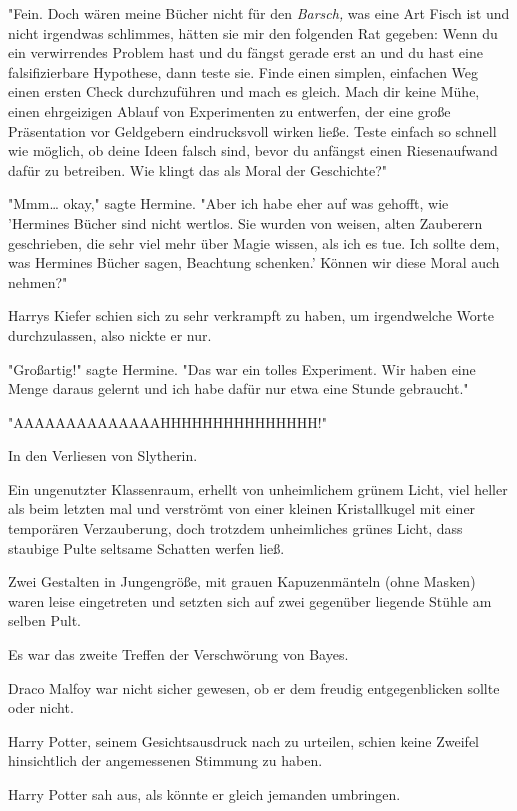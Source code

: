 {"Fein. Doch wären meine Bücher nicht für den \emph{Barsch,} was eine Art Fisch ist und nicht irgendwas schlimmes, hätten sie mir den folgenden Rat gegeben: Wenn du ein verwirrendes Problem hast und du fängst gerade erst an und du hast eine falsifizierbare Hypothese, dann teste sie. Finde einen simplen, einfachen Weg einen ersten Check durchzuführen und mach es gleich. Mach dir keine Mühe, einen ehrgeizigen Ablauf von Experimenten zu entwerfen, der eine große Präsentation vor Geldgebern eindrucksvoll wirken ließe. Teste einfach so schnell wie möglich, ob deine Ideen falsch sind, bevor du anfängst einen Riesenaufwand dafür zu betreiben. Wie klingt das als Moral der Geschichte?"

"Mmm… okay," sagte Hermine. "Aber ich habe eher auf was gehofft, wie 'Hermines Bücher sind nicht wertlos. Sie wurden von weisen, alten Zauberern geschrieben, die sehr viel mehr über Magie wissen, als ich es tue. Ich sollte dem, was Hermines Bücher sagen, Beachtung schenken.' Können wir diese Moral auch nehmen?"

Harrys Kiefer schien sich zu sehr verkrampft zu haben, um irgendwelche Worte durchzulassen, also nickte er nur.

"Großartig!" sagte Hermine. "Das war ein tolles Experiment. Wir haben eine Menge daraus gelernt und ich habe dafür nur etwa eine Stunde gebraucht."

"AAAAAAAAAAAAAAHHHHHHHHHHHHHHH!"

\later

In den Verliesen von Slytherin.

Ein ungenutzter Klassenraum, erhellt von unheimlichem grünem Licht, viel heller als beim letzten mal und verströmt von einer kleinen Kristallkugel mit einer temporären Verzauberung, doch trotzdem unheimliches grünes Licht, dass staubige Pulte seltsame Schatten werfen ließ.

Zwei Gestalten in Jungengröße, mit grauen Kapuzenmänteln (ohne Masken) waren leise eingetreten und setzten sich auf zwei gegenüber liegende Stühle am selben Pult.

Es war das zweite Treffen der Verschwörung von Bayes.

Draco Malfoy war nicht sicher gewesen, ob er dem freudig entgegenblicken sollte oder nicht.

Harry Potter, seinem Gesichtsausdruck nach zu urteilen, schien keine Zweifel hinsichtlich der angemessenen Stimmung zu haben.

Harry Potter sah aus, als könnte er gleich jemanden umbringen.

}
